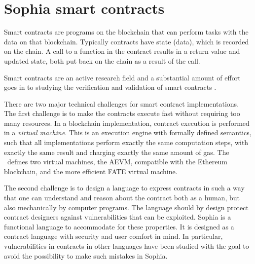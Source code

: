 \section{Sophia smart contracts}
\label{sect:sophia}

Smart contracts \cite{szabo1996smart,hhz007} are
programs on the blockchain that can perform tasks with the data on that
blockchain. Typically contracts have state (data), which is recorded on the
chain. A call to a function in the contract results in a return value
and updated state, both put back on the chain as a result of the
call.

Smart contracts are an active research field
\cite{DBLP:journals/corr/abs-1710-06372} and a substantial amount of
  effort goes in to studying the verification and validation of smart contracts
  \cite{magazzeni2017validation,bhargavan2016formal}.

There are two major technical challenges for smart contract
implementations. The first challenge is to make the contracts
execute fast without requiring too many resources. In a blockchain
implementation, contract execution is performed in a
\textit{virtual machine}. This is an execution engine with formally
defined semantics, such that all implementations perform exactly the
same computation steps, with exactly the same result and charging
exactly the same amount of gas. The \blockchain\ defines two virtual
machines, the AEVM, compatible with the Ethereum blockchain, and the more
efficient FATE virtual machine.

The second challenge is to design a language to express contracts in
such a way that one can understand and reason about the contract
both as a human, but also mechanically by computer programs. The
language should by design protect contract designers against
vulnerabilities that can be exploited. Sophia is a functional language
to accommodate for these properties. It is designed as a contract
language with security and user comfort in mind. In particular,
vulnerabilities in contracts in other languages
\cite{atzei2017survey,mehar2019understanding,delmolino2016step} have been
studied with the goal to
avoid the possibility to make such mistakes in Sophia.


